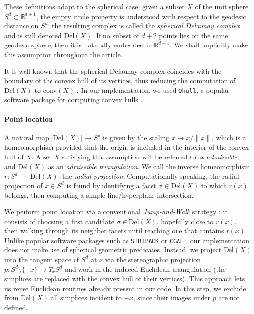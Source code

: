 \documentclass[a4paper,english,cleveref,autoref,thm-restate,nolineno]{socg-lipics-v2021}
\newcommand{\R}{\mathbb R}
\newcommand{\geomreal}[1] { |#1| } %
\newcommand{\Del}[1] { \mathrm{Del}(#1) } %
\newcommand{\conv}[1] { \mathrm{conv}(#1) } %
\begin{document}
These definitions adapt to the spherical case: given a subset $X$ of the unit sphere $S^d\subset\R^{d+1}$, the empty circle property is understood with respect to the geodesic distance on $S^d$; the resulting complex is called the \emph{spherical Delaunay complex} and is still denoted $\Del{X}$.
If no subset of $d+2$ points lies on the same geodesic sphere, then it is naturally embedded in $\R^{d+1}$.
We shall implicitly make this assumption throughout the article.

It is well-known that the spherical Delaunay complex coincides with the boundary of the convex hull of its vertices, thus reducing the computation of $\Del{X}$ to $\conv{X}$ \cite{b-gtfga-80}.
In our implementation, we used \texttt{Qhull}, a popular software package for computing convex hulls \cite{barber1996quickhull}.

\paragraph*{Point location}

A natural map $\geomreal{\Del{X}}\to S^d$ is given by the scaling $x\mapsto x/\|x\|$, which is a homeomorphism provided that the origin is included in the interior of the convex hull of $X$.
A set $X$ satisfying this assumption will be referred to as \emph{admissible}, and $\Del{X}$ as an \emph{admissible triangulation}.
We call the inverse homeomorphism $r\colon S^d\to\geomreal{\Del{X}}$ the \emph{radial projection}.
Computationally speaking, the radial projection of $x\in S^d$ is found by identifying a facet $\sigma\in\Del{X}$ to which $r(x)$ belongs, then computing a simple line/hyperplane intersection.

We perform point location via a conventional \emph{Jump-and-Walk} strategy \cite{mucke1996fast}: it consists of choosing a first candidate $\sigma\in\Del{X}$, hopefully close to $r(x)$, then walking through its neighbor facets until reaching one that contains $r(x)$.
Unlike popular software packages such as \texttt{STRIPACK} or \texttt{CGAL} \cite{cgal:eb-25b,renka1997algorithm}, our implementation does not make use of spherical geometric predicates.
Instead, we project $\Del{X}$ into the tangent space of $S^d$ at $x$ via the stereographic projection $p\colon S^d\setminus\{-x\}\to T_x S^d$ and work in the induced Euclidean triangulation (the simplices are replaced with the convex hull of their vertices).
This approach lets us reuse Euclidean routines already present in our code.
In this step, we exclude from $\Del{X}$ all simplices incident to $-x$, since their images under $p$ are not defined.
\end{document}
